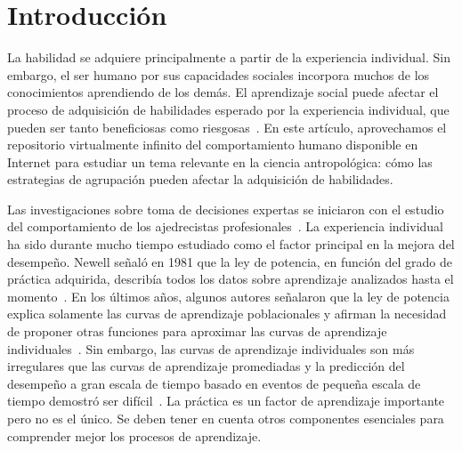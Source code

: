 \documentclass[a4paper,11pt]{book}
\theoremstyle{definition}
\begin{document}
\section{Introducción}

La habilidad se adquiere principalmente a partir de la experiencia individual.
%
Sin embargo, el ser humano por sus capacidades sociales incorpora muchos de los conocimientos aprendiendo de los demás.
%
El aprendizaje social puede afectar el proceso de adquisición de habilidades esperado por la experiencia individual, que pueden ser tanto beneficiosas como riesgosas~\cite{Boyd2011}.
%
En este artículo, aprovechamos el repositorio virtualmente infinito del comportamiento humano disponible en Internet para estudiar un tema relevante en la ciencia antropológica: cómo las estrategias de agrupación pueden afectar la adquisición de habilidades.


Las investigaciones sobre toma de decisiones expertas se iniciaron con el estudio del comportamiento de los ajedrecistas profesionales~\cite{deGroot1978-thoughtAndChoiceInChess,chase1973-perceptionInChess,simon1974-howBigIsAChunk}.
%
La experiencia individual ha sido durante mucho tiempo estudiado como el factor principal en la mejora del desempeño.
%
Newell señaló en 1981 que la ley de potencia, en función del grado de práctica adquirida, describía todos los datos sobre aprendizaje analizados hasta el momento~\cite{Newell1981}.
%
En los últimos años, algunos autores señalaron que la ley de potencia explica solamente las curvas de aprendizaje poblacionales y afirman la necesidad de proponer otras funciones para aproximar las curvas de aprendizaje individuales~\cite{heathcote2000-powerLawRepealedExponentialLawOfPractice}.
%
Sin embargo, las curvas de aprendizaje individuales son más irregulares que las curvas de aprendizaje promediadas y la predicción del desempeño a gran escala de tiempo basado en eventos de pequeña escala de tiempo demostró ser difícil~\cite{howard2014-learningCurvesChessPlayersATestOfPowerLawGenerality}.
%
La práctica es un factor de aprendizaje importante pero no es el único.
%
Se deben tener en cuenta otros componentes esenciales para comprender mejor los procesos de aprendizaje.

\end{document}
